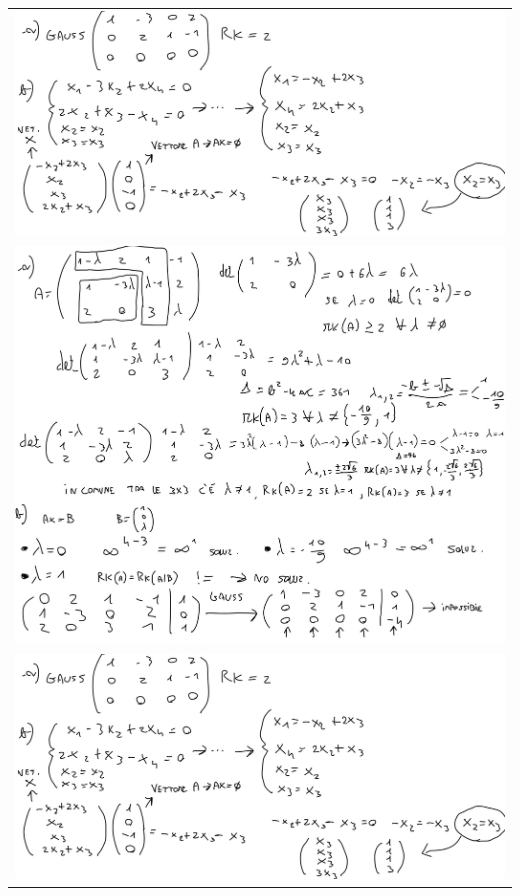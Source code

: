 \documentclass[10pt]{article}
\begin{document}
\begin{landscape}
\noindent
\begin{minipage}[t]{0.49\textwidth}
\begin{tabular}{c}
    \includegraphics[scale=0.12]{es1.jpeg} \\ 
    \includegraphics[scale=0.16]{es2.jpeg} \\
    \includegraphics[scale=0.12]{es1.jpeg} \\

\end{tabular}
\end{minipage}
\end{landscape}
\end{document}
